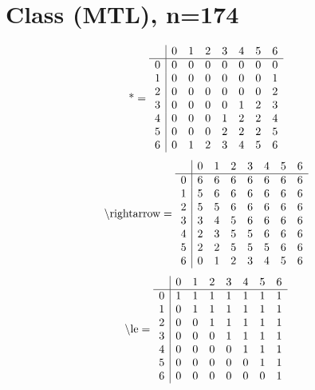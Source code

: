 \documentclass[11pt]{article}
\begin{document}
\section{Class (MTL), n=174}
\[\text{*} = 
\begin{array}{r | r r r r r r r}
 & 0 & 1 & 2 & 3 & 4 & 5 & 6 \\ \hline
0 & 0 & 0 & 0 & 0 & 0 & 0 & 0 \\
1 & 0 & 0 & 0 & 0 & 0 & 0 & 1 \\
2 & 0 & 0 & 0 & 0 & 0 & 0 & 2 \\
3 & 0 & 0 & 0 & 0 & 1 & 2 & 3 \\
4 & 0 & 0 & 0 & 1 & 2 & 2 & 4 \\
5 & 0 & 0 & 0 & 2 & 2 & 2 & 5 \\
6 & 0 & 1 & 2 & 3 & 4 & 5 & 6 \\
\end{array}
\]
\[\text{\textbackslash rightarrow} = 
\begin{array}{r | r r r r r r r}
 & 0 & 1 & 2 & 3 & 4 & 5 & 6 \\ \hline
0 & 6 & 6 & 6 & 6 & 6 & 6 & 6 \\
1 & 5 & 6 & 6 & 6 & 6 & 6 & 6 \\
2 & 5 & 5 & 6 & 6 & 6 & 6 & 6 \\
3 & 3 & 4 & 5 & 6 & 6 & 6 & 6 \\
4 & 2 & 3 & 5 & 5 & 6 & 6 & 6 \\
5 & 2 & 2 & 5 & 5 & 5 & 6 & 6 \\
6 & 0 & 1 & 2 & 3 & 4 & 5 & 6 \\
\end{array}
\]
\[\text{\textbackslash le} = 
\begin{array}{r | r r r r r r r}
 & 0 & 1 & 2 & 3 & 4 & 5 & 6 \\ \hline
0 & 1 & 1 & 1 & 1 & 1 & 1 & 1 \\
1 & 0 & 1 & 1 & 1 & 1 & 1 & 1 \\
2 & 0 & 0 & 1 & 1 & 1 & 1 & 1 \\
3 & 0 & 0 & 0 & 1 & 1 & 1 & 1 \\
4 & 0 & 0 & 0 & 0 & 1 & 1 & 1 \\
5 & 0 & 0 & 0 & 0 & 0 & 1 & 1 \\
6 & 0 & 0 & 0 & 0 & 0 & 0 & 1 \\
\end{array}
\]
\end{document}
